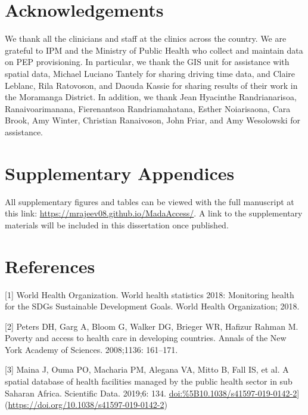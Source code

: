 \documentclass[
]{book}
\begin{document}
\hypertarget{acknowledgements-1}{%
\section{Acknowledgements}\label{acknowledgements-1}}

We thank all the clinicians and staff at the clinics across the country.
We are grateful to IPM and the Ministry of Public Health who collect and
maintain data on PEP provisioning. In particular, we thank the GIS unit
for assistance with spatial data, Michael Luciano Tantely for sharing
driving time data, and Claire Leblanc, Rila Ratovoson, and Daouda Kassie
for sharing results of their work in the Moramanga District. In
addition, we thank Jean Hyacinthe Randrianarisoa, Ranaivoarimanana,
Fierenantsoa Randriamahatana, Esther Noiarisaona, Cara Brook, Amy
Winter, Christian Ranaivoson, John Friar, and Amy Wesolowski for
assistance.

\hypertarget{supplementary-appendices}{%
\section{Supplementary Appendices}\label{supplementary-appendices}}

All supplementary figures and tables can be viewed with the full manuscript at this link:
\url{https://mrajeev08.github.io/MadaAccess/}. A link to the supplementary materials will be included in this dissertation once published.

\hypertarget{references-2}{%
\section{References}\label{references-2}}

{[}1{]} World Health Organization. World health statistics 2018: Monitoring
health for the SDGs Sustainable Development Goals. World Health
Organization; 2018.

{[}2{]} Peters DH, Garg A, Bloom G, Walker DG, Brieger WR, Hafizur Rahman M.
Poverty and access to health care in developing countries. Annals of the
New York Academy of Sciences. 2008;1136: 161--171.

{[}3{]} Maina J, Ouma PO, Macharia PM, Alegana VA, Mitto B, Fall IS, et al.
A spatial database of health facilities managed by the public health
sector in sub Saharan Africa. Scientific Data. 2019;6: 134.
\url{doi:\%5B10.1038/s41597-019-0142-2}{]}(\url{https://doi.org/10.1038/s41597-019-0142-2})
\end{document}
